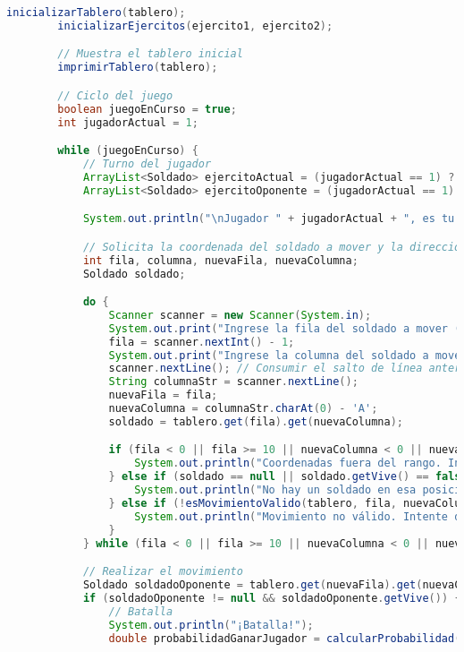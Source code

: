 \documentclass{article}
\begin{document}
\begin{itemize}
\begin{lstlisting}[language=java]
        inicializarTablero(tablero);
        inicializarEjercitos(ejercito1, ejercito2);

        // Muestra el tablero inicial
        imprimirTablero(tablero);

        // Ciclo del juego
        boolean juegoEnCurso = true;
        int jugadorActual = 1;

        while (juegoEnCurso) {
            // Turno del jugador
            ArrayList<Soldado> ejercitoActual = (jugadorActual == 1) ? ejercito1 : ejercito2;
            ArrayList<Soldado> ejercitoOponente = (jugadorActual == 1) ? ejercito2 : ejercito1;

            System.out.println("\nJugador " + jugadorActual + ", es tu turno:");

            // Solicita la coordenada del soldado a mover y la dirección
            int fila, columna, nuevaFila, nuevaColumna;
            Soldado soldado;

            do {
                Scanner scanner = new Scanner(System.in);
                System.out.print("Ingrese la fila del soldado a mover (1-10): ");
                fila = scanner.nextInt() - 1;
                System.out.print("Ingrese la columna del soldado a mover (A-J): ");
                scanner.nextLine(); // Consumir el salto de línea anterior
                String columnaStr = scanner.nextLine();
                nuevaFila = fila;
                nuevaColumna = columnaStr.charAt(0) - 'A';
                soldado = tablero.get(fila).get(nuevaColumna);

                if (fila < 0 || fila >= 10 || nuevaColumna < 0 || nuevaColumna >= 10) {
                    System.out.println("Coordenadas fuera del rango. Intente de nuevo.");
                } else if (soldado == null || soldado.getVive() == false) {
                    System.out.println("No hay un soldado en esa posición o está muerto. Intente de nuevo.");
                } else if (!esMovimientoValido(tablero, fila, nuevaColumna, nuevaFila, nuevaColumna)) {
                    System.out.println("Movimiento no válido. Intente de nuevo.");
                }
            } while (fila < 0 || fila >= 10 || nuevaColumna < 0 || nuevaColumna >= 10 || soldado == null || soldado.getVive() == false || !esMovimientoValido(tablero, fila, nuevaColumna, nuevaFila, nuevaColumna));

            // Realizar el movimiento
            Soldado soldadoOponente = tablero.get(nuevaFila).get(nuevaColumna);
            if (soldadoOponente != null && soldadoOponente.getVive()) {
                // Batalla
                System.out.println("¡Batalla!");
                double probabilidadGanarJugador = calcularProbabilidad(soldado.getPuntos(), soldadoOponente.getPuntos());


\end{lstlisting}
\end{itemize}
\end{document}

